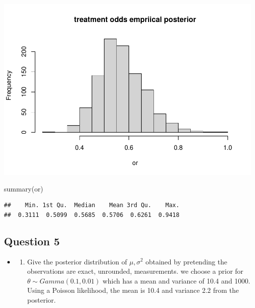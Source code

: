 \documentclass[
]{book}
\newenvironment{Shaded}{\begin{snugshade}}{\end{snugshade}}
\newcommand{\FunctionTok}[1]{\textcolor[rgb]{0.00,0.00,0.00}{#1}}
\newcommand{\NormalTok}[1]{#1}
\providecommand{\tightlist}{%
  \setlength{\itemsep}{0pt}\setlength{\parskip}{0pt}}
\theoremstyle{definition}
\theoremstyle{definition}
\theoremstyle{definition}
\theoremstyle{definition}
\theoremstyle{remark}
\begin{document}
\includegraphics{_main_files/figure-latex/unnamed-chunk-38-2.pdf}

\begin{Shaded}
\begin{Highlighting}[]
  \FunctionTok{summary}\NormalTok{(or)}
\end{Highlighting}
\end{Shaded}

\begin{verbatim}
##    Min. 1st Qu.  Median    Mean 3rd Qu.    Max. 
##  0.3111  0.5099  0.5685  0.5706  0.6261  0.9418
\end{verbatim}

\hypertarget{question-5}{%
\subsection*{Question 5}\label{question-5}}

\begin{itemize}
\item
  \begin{enumerate}
  \def\labelenumi{(\alph{enumi})}
  \tightlist
  \item
    Give the posterior distribution of \(\mu, \sigma^2\) obtained by pretending the observations are exact, unrounded, measurements. we choose a prior for \(\theta \sim Gamma(0.1,0.01)\) which has a mean and variance of 10.4 and 1000. Using a Poisson likelihood, the mean is 10.4 and variance 2.2 from the posterior.
  \end{enumerate}
\end{itemize}
\end{document}
